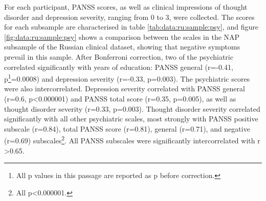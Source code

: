 For each participant, PANSS scores, as well as clinical impressions of thought disorder and depression severity, ranging from 0 to 3, were collected. The scores for each subsample are characterised in table \ref{tab:data:ru:sample:psy}, and figure \ref{fig:data:ru:sample:psy} shows a comparison between the scales in the NAP subsample of the Russian clinical dataset, showing that negative symptoms prevail in this sample. After Bonferroni correction, two of the psychiatric correlated significantly with years of education: PANSS general	(r=-0.41, p\footnote{All p values in this passage are reported as p before correction.}=0.0008) and depression severity (r=-0.33, p=0.003). The psychiatric scores were also intercorrelated. Depression severity correlated with PANSS general (r=0.6, p\textless0.000001) and PANSS total score (r=0.35, p=0.005), as well as thought disorder severity (r=0.33, p=0.003). Thought disorder severity correlated significantly with all other psychiatric scales, most strongly with PANSS positive subscale (r=0.84), total PANSS score (r=0.81), general (r=0.71), and negative (r=0.69) subscales\footnote{All p\textless0.000001.}. All PANSS subscales were significantly intercorrelated with r \textgreater 0.65. 

